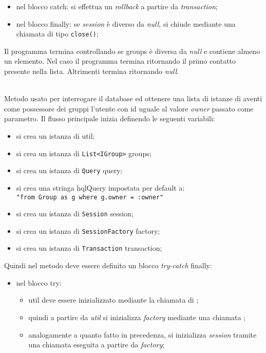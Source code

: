 \begin{description}
\begin{itemize}
\begin{itemize}
		\end{itemize}
		\item nel blocco catch: si effettua un \textit{rollback} a partire da \textit{transaction};
		\item nel blocco finally: se \textit{session} è diverso da \textit{null}, si chiude mediante una chiamata di tipo \texttt{close()};
	\end{itemize}
	Il programma termina controllando se groups è diversa da \textit{null} e contiene almeno un elemento. Nel caso il programma termina ritornando il primo contatto presente nella lista. Altrimenti termina ritornando \textit{null}.
	
	\item{}\\
	Metodo usato per interrogare il database ed ottenere una lista di istanze di  aventi come possessore dei gruppi l'utente con id uguale al valore \textit{owner} passato come parametro. Il flusso principale inizia definendo le seguenti variabili:
	\begin{itemize}
		\item si crea un istanza di  util;
		\item si crea un istanza di \texttt{List<IGroup>} groups;
		\item si crea un istanza di \texttt{Query} query;
		\item si crea una stringa hqlQuery impostata per default a:\\
			\verb|"from Group as g where g.owner = :owner"|
		\item si crea un istanza di \texttt{Session} session;
		\item si crea un istanza di \texttt{SessionFactory} factory;
		\item si crea un istanza di \texttt{Transaction} transaction;
	\end{itemize}
	Quindi nel metodo deve essere definito un blocco \textit{try-catch} finally:
	\begin{itemize}
		\item nel blocco try:
		\begin{itemize}
			\item util deve essere inizializzato mediante la chiamata  di ;
			\item quindi a partire da \textit{util} si inizializza \textit{factory} mediante una chiamata ;
			\item analogamente a quanto fatto in precedenza, si inizializza \textit{session} tramite una chiamata  eseguita a partire da \textit{factory};

\end{itemize}
\end{itemize}
\end{description}
